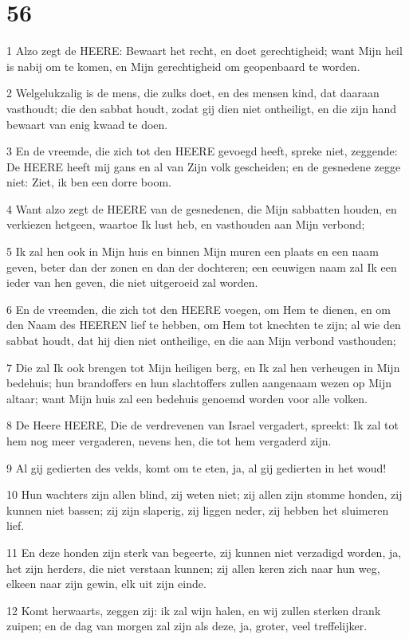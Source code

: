 \chapter{56}

\par 1 Alzo zegt de HEERE: Bewaart het recht, en doet gerechtigheid; want Mijn heil is nabij om te komen, en Mijn gerechtigheid om geopenbaard te worden.
\par 2 Welgelukzalig is de mens, die zulks doet, en des mensen kind, dat daaraan vasthoudt; die den sabbat houdt, zodat gij dien niet ontheiligt, en die zijn hand bewaart van enig kwaad te doen.
\par 3 En de vreemde, die zich tot den HEERE gevoegd heeft, spreke niet, zeggende: De HEERE heeft mij gans en al van Zijn volk gescheiden; en de gesnedene zegge niet: Ziet, ik ben een dorre boom.
\par 4 Want alzo zegt de HEERE van de gesnedenen, die Mijn sabbatten houden, en verkiezen hetgeen, waartoe Ik lust heb, en vasthouden aan Mijn verbond;
\par 5 Ik zal hen ook in Mijn huis en binnen Mijn muren een plaats en een naam geven, beter dan der zonen en dan der dochteren; een eeuwigen naam zal Ik een ieder van hen geven, die niet uitgeroeid zal worden.
\par 6 En de vreemden, die zich tot den HEERE voegen, om Hem te dienen, en om den Naam des HEEREN lief te hebben, om Hem tot knechten te zijn; al wie den sabbat houdt, dat hij dien niet ontheilige, en die aan Mijn verbond vasthouden;
\par 7 Die zal Ik ook brengen tot Mijn heiligen berg, en Ik zal hen verheugen in Mijn bedehuis; hun brandoffers en hun slachtoffers zullen aangenaam wezen op Mijn altaar; want Mijn huis zal een bedehuis genoemd worden voor alle volken.
\par 8 De Heere HEERE, Die de verdrevenen van Israel vergadert, spreekt: Ik zal tot hem nog meer vergaderen, nevens hen, die tot hem vergaderd zijn.
\par 9 Al gij gedierten des velds, komt om te eten, ja, al gij gedierten in het woud!
\par 10 Hun wachters zijn allen blind, zij weten niet; zij allen zijn stomme honden, zij kunnen niet bassen; zij zijn slaperig, zij liggen neder, zij hebben het sluimeren lief.
\par 11 En deze honden zijn sterk van begeerte, zij kunnen niet verzadigd worden, ja, het zijn herders, die niet verstaan kunnen; zij allen keren zich naar hun weg, elkeen naar zijn gewin, elk uit zijn einde.
\par 12 Komt herwaarts, zeggen zij: ik zal wijn halen, en wij zullen sterken drank zuipen; en de dag van morgen zal zijn als deze, ja, groter, veel treffelijker.

